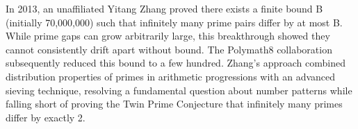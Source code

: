 In 2013, an unaffiliated Yitang Zhang proved there exists a finite bound B (initially 70,000,000) such that infinitely many prime pairs differ by at most B. While prime gaps can grow arbitrarily large, this breakthrough showed they cannot consistently drift apart without bound. The Polymath8 collaboration subsequently reduced this bound to a few hundred. Zhang's approach combined distribution properties of primes in arithmetic progressions with an advanced sieving technique, resolving a fundamental question about number patterns while falling short of proving the Twin Prime Conjecture that infinitely many primes differ by exactly 2.
